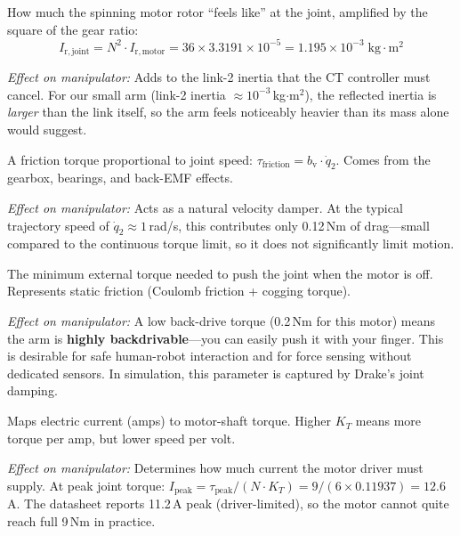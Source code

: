 \documentclass[11pt,a4paper]{article}
\begin{document}
\begin{description}[leftmargin=2em, style=nextline, font=\bfseries\sffamily\color{seaorange}]
\item[Reflected rotor inertia ($I_{\mathrm{r,joint}} = 1.20 \times 10^{-3}$\,kg$\cdot$m$^2$)]
How much the spinning motor rotor ``feels like'' at the joint, amplified by the square of the gear ratio:
\begin{equation}
    I_{\mathrm{r,joint}} = N^2 \cdot I_{\mathrm{r,motor}} = 36 \times 3.3191 \times 10^{-5} = 1.195 \times 10^{-3} \;\text{kg$\cdot$m$^2$}
\end{equation}

\textit{Effect on manipulator:}  Adds to the link-2 inertia that the CT controller must cancel.  For our small arm (link-2 inertia $\approx 10^{-3}$\,kg$\cdot$m$^2$), the reflected inertia is \emph{larger} than the link itself, so the arm feels noticeably heavier than its mass alone would suggest.

\item[Viscous damping ($b_{\mathrm{v}} = 0.12$\,Nm$\cdot$s/rad)]
A friction torque proportional to joint speed: $\tau_{\mathrm{friction}} = b_{\mathrm{v}} \cdot \dot{q}_2$.  Comes from the gearbox, bearings, and back-EMF effects.

\textit{Effect on manipulator:}  Acts as a natural velocity damper.  At the typical trajectory speed of $\dot{q}_2 \approx 1$\,rad/s, this contributes only 0.12\,Nm of drag---small compared to the continuous torque limit, so it does not significantly limit motion.

\item[Back-drive torque ($\tau_{\mathrm{bd}} = 0.2$\,Nm)]
The minimum external torque needed to push the joint when the motor is off.  Represents static friction (Coulomb friction + cogging torque).

\textit{Effect on manipulator:}  A low back-drive torque (0.2\,Nm for this motor) means the arm is \textbf{highly backdrivable}---you can easily push it with your finger.  This is desirable for safe human-robot interaction and for force sensing without dedicated sensors.  In simulation, this parameter is captured by Drake's joint damping.

\item[Torque constant ($K_T = 0.11937$\,Nm/A)]
Maps electric current (amps) to motor-shaft torque.  Higher $K_T$ means more torque per amp, but lower speed per volt.

\textit{Effect on manipulator:}  Determines how much current the motor driver must supply.  At peak joint torque: $I_{\mathrm{peak}} = \tau_{\mathrm{peak}} / (N \cdot K_T) = 9 / (6 \times 0.11937) = 12.6$\,A.  The datasheet reports 11.2\,A peak (driver-limited), so the motor cannot quite reach full 9\,Nm in practice.


\end{description}
\end{document}
